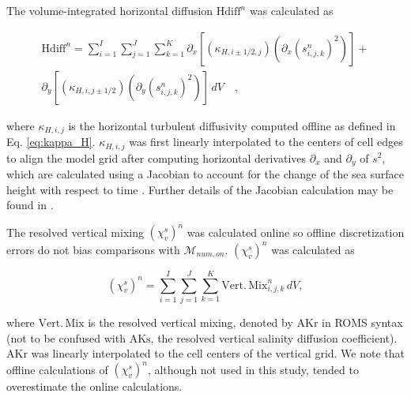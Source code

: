 \documentclass[draft]{agujournal2019}
\begin{document}
The volume-integrated horizontal diffusion $\mathrm{Hdiff}^n$ was calculated as
\begin{linenomath*}
    \begin{equation}
        \begin{split} \label{eq:append_hdiff}
            \mathrm{Hdiff}^n = \sum_{i=1}^{I}\sum_{j=1}^{J}\sum_{k=1}^{K} \partial_x \left[(\kappa_{H,i \pm 1/2,j}) \left(\partial_x (s_{i,j,k}^{n})^2\right)\right] + \\ \partial_y \left[(\kappa_{H,i,j \pm 1/2}) \left(\partial_y (s_{i,j,k}^{n})^2\right) \right]\, dV \quad ,
        \end{split}
    \end{equation}
\end{linenomath*}
where $\kappa_{H,i,j}$ is the horizontal turbulent diffusivity computed offline as defined in Eq. \ref{eq:kappa_H}. $\kappa_{H,i,j}$ was first linearly interpolated to the centers of cell edges to align the model grid after computing horizontal derivatives $\partial_x$ and $\partial_y$ of $s^2$, which are calculated using a Jacobian to account for the change of the sea surface height with respect to time \cite{shchepetkin2005regional}. Further details of the Jacobian calculation may be found in . 

The resolved vertical mixing $(\chi_v^s)^n$ was calculated online so offline discretization errors do not bias comparisons with $\mathcal{M}_{num, on}$. $(\chi_v^s)^n$ was calculated as 
\begin{linenomath*}
    \begin{equation} \label{eq:append_vmix}
        (\chi_v^s)^n = \sum_{i=1}^{I}\sum_{j=1}^{J}\sum_{k=1}^{K} \mathrm{Vert. \, Mix}_{i,j,k}^n \, dV,
    \end{equation}
\end{linenomath*}
where $\mathrm{Vert. \, Mix}$ is the resolved vertical mixing, denoted by $\mathrm{AKr}$ in ROMS syntax (not to be confused with $\mathrm{AKs}$, the resolved vertical salinity diffusion coefficient). $\mathrm{AKr}$ was linearly interpolated to the cell centers of the vertical grid. We note that offline calculations of $(\chi_v^s)^n$, although not used in this study, tended to overestimate the online calculations.
\end{document}
